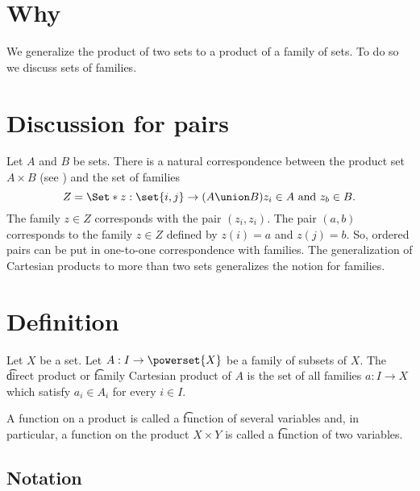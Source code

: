 
\section*{Why}

We generalize the product of two sets to a product of a family of sets.
To do so we discuss sets of families.

\section*{Discussion for pairs}

Let $A$ and $B$ be sets.
There is a natural correspondence between the product set $A \times B$ (see ) and the set of families
\[
Z = \Set*{z: \set{i, j} \to (A \union B)}{z_i \in A \text{ and } z_b \in B}.
\]
The family $z \in Z$ corresponds with the pair $(z_i, z_i)$.
The pair $(a, b)$ corresponds to the family $z \in Z$ defined by $z(i) = a$ and $z(j) = b$.
So, ordered pairs can be put in one-to-one correspondence with families.
The generalization of Cartesian products to more than two sets generalizes the notion for families.

\section*{Definition}

Let $X$ be a set.
Let $A: I \to \powerset{X}$ be a family of subsets of $X$.
The \t{direct product} or \t{family Cartesian product} of $A$ is the set of all families $a: I \to X$ which satisfy $a_i \in A_i$ for every $i \in I$.

A function on a product is called a \t{function of several variables} and, in particular, a function on the product $X \times  Y$ is called a \t{function of two variables.}


\subsection*{Notation}

